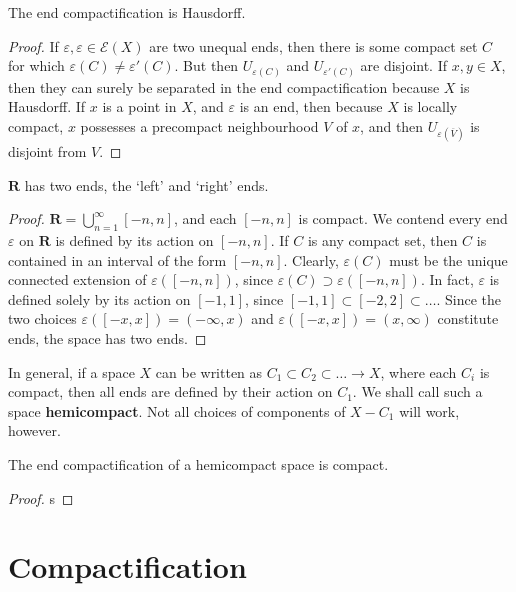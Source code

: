 \begin{example}
\begin{lemma}
    The end compactification is Hausdorff.
\end{lemma}
\begin{proof}
    If $\varepsilon, \varepsilon \in \mathcal{E}(X)$ are two unequal ends, then there is some compact set $C$ for which $\varepsilon(C) \neq \varepsilon'(C)$. But then $U_{\varepsilon(C)}$ and $U_{\varepsilon'(C)}$ are disjoint. If $x, y \in X$, then they can surely be separated in the end compactification because $X$ is Hausdorff. If $x$ is a point in $X$, and $\varepsilon$ is an end, then because $X$ is locally compact, $x$ possesses a precompact neighbourhood $V$ of $x$, and then $U_{\varepsilon(\overline{V})}$ is disjoint from $V$.
\end{proof}

\begin{lemma}
    $\mathbf{R}$ has two ends, the `left' and `right' ends.
\end{lemma}
\begin{proof}
    $\mathbf{R} = \bigcup_{n = 1}^\infty [-n, n]$, and each $[-n, n]$ is compact. We contend every end $\varepsilon$ on $\mathbf{R}$ is defined by its action on $[-n, n]$. If $C$ is any compact set, then $C$ is contained in an interval of the form $[-n, n]$. Clearly, $\varepsilon(C)$ must be the unique connected extension of $\varepsilon([-n, n])$, since $\varepsilon(C) \supset \varepsilon([-n,n])$. In fact, $\varepsilon$ is defined solely by its action on $[-1,1]$, since $[-1,1] \subset [-2,2] \subset \dots$. Since the two choices $\varepsilon([-x,x]) = (-\infty, x)$ and $\varepsilon([-x,x]) = (x,\infty)$ constitute ends, the space has two ends.
\end{proof}

In general, if a space $X$ can be written as $C_1 \subset C_2 \subset \dots \to X$, where each $C_i$ is compact, then all ends are defined by their action on $C_1$. We shall call such a space {\bf hemicompact}. Not all choices of components of $X - C_1$ will work, however.

\begin{lemma}
    The end compactification of a hemicompact space is compact.
\end{lemma}
\begin{proof}
    s
\end{proof}

\chapter{Compactification}


\end{example}
